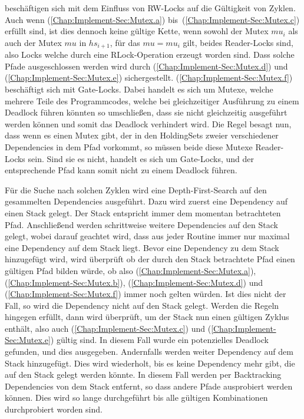 beschäftigen sich mit dem Einfluss von RW-Locks auf die Gültigkeit von 
Zyklen. Auch wenn (\ref{Chap:Implement-Sec:Mutex.a}) bis~(\ref{Chap:Implement-Sec:Mutex.c})
erfüllt sind, ist dies dennoch keine gültige Kette, wenn sowohl
der Mutex $mu_i$ als auch der Mutex $mu$ in $hs_{i+1}$, 
für das $mu = mu_i$ gilt, beides Reader-Locks
sind, also Locks welche durch eine RLock-Operation erzeugt worden sind. 
Dass solche Pfade ausgeschlossen werden wird durch (\ref{Chap:Implement-Sec:Mutex.d})
und (\ref{Chap:Implement-Sec:Mutex.e}) sichergestellt.
(\ref{Chap:Implement-Sec:Mutex.f}) beschäftigt sich mit Gate-Locks. 
Dabei handelt es sich um Mutexe, welche mehrere Teile des Programmcodes,
welche bei gleichzeitiger Ausführung zu einem Deadlock führen könnten 
so umschließen, dass sie nicht gleichzeitig ausgeführt werden können und somit das Deadlock 
verhindert wird.
Die Regel besagt nun, dass wenn es einen Mutex gibt,
der in den HoldingSets zweier verschiedener Dependencies in dem Pfad vorkommt, so müssen
beide diese Mutexe Reader-Locks sein. Sind sie es nicht, handelt es sich um Gate-Locks, und
der entsprechende Pfad kann somit nicht zu einem Deadlock führen.

Für die Suche nach solchen Zyklen wird eine Depth-First-Search auf den gesammelten 
Dependencies ausgeführt. Dazu wird zuerst eine Dependency auf einen Stack gelegt. 
Der Stack entspricht immer dem momentan
betrachteten Pfad. Anschließend werden schrittweise weitere Dependencies auf den 
Stack gelegt, wobei darauf geachtet wird, dass aus jeder Routine immer nur maximal 
eine Dependency auf dem Stack liegt. Bevor eine Dependency zu dem Stack 
hinzugefügt wird, wird überprüft ob der durch den Stack betrachtete Pfad 
einen gültigen Pfad bilden würde, ob also (\ref{Chap:Implement-Sec:Mutex.a}), 
(\ref{Chap:Implement-Sec:Mutex.b}), (\ref{Chap:Implement-Sec:Mutex.d}) und 
(\ref{Chap:Implement-Sec:Mutex.f}) immer noch gelten würden. Ist dies nicht
der Fall, so wird die Dependency nicht auf den Stack gelegt. Werden die 
Regeln hingegen erfüllt, dann wird überprüft, um der Stack nun einen gültigen
Zyklus enthält, also auch (\ref{Chap:Implement-Sec:Mutex.c}) und (\ref{Chap:Implement-Sec:Mutex.e})
gültig sind. In diesem Fall wurde ein potenzielles Deadlock gefunden, und dies 
ausgegeben. Andernfalls werden weiter Dependency auf dem Stack hinzugefügt. 
Dies wird wiederholt, bis es keine Dependency mehr gibt, die auf den Stack
gelegt werden könnte. In diesem Fall werden per Backtracking Dependencies 
von dem Stack entfernt, so dass andere Pfade ausprobiert werden können.
Dies wird so lange durchgeführt bis alle gültigen Kombinationen durchprobiert 
worden sind.

